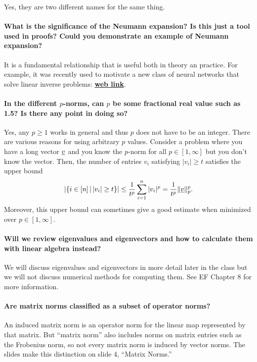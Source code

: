 \documentclass[10pt,english]{article}
\begin{document}
Yes, they are two different names for the same thing.

\paragraph{What is the significance of the Neumann expansion? Is this just a tool used in proofs? Could you demonstrate an example of Neumann expansion?}

It is a fundamental relationship that is useful both in theory an practice.
For example, it was recently used to motivate a new class of neural networks that solve linear inverse problems: \href{https://arxiv.org/pdf/1901.03707.pdf}{\textbf{web link}}.

\paragraph{In the different $p$-norms, can $p$ be some fractional real value such as 1.5? Is there any point in doing so?}

Yes, any $p\geq 1$ works in general and thus $p$ does not have to be an integer.
There are various reasons for using arbitrary $p$ values.
Consider a problem where you have a long vector $\underline{v}$ and you know the $p$-norm for all $p\in [1,\infty]$ but you don't know the vector.
Then, the number of entries $v_i$ satisfying $|v_i| \geq t$ satisfies the upper bound $$\left| \{i\in [n]\,|\, |v_i|\geq t \} \right| \leq \frac{1}{t^p} \sum_{i=1}^n |v_i|^p = \frac{1}{t^p} \| \underline{v} \|_p^p . $$
Moreover, this upper bound can sometimes give a good estimate when minimized over $p\in [1,\infty]$.

\paragraph{Will we review eigenvalues and eigenvectors and how to calculate them with linear algebra instead?}

We will discuss eigenvalues and eigenvectors in more detail later in the class but we will not discuss numerical methods for computing them.
See EF Chapter 8 for more information.

\paragraph{Are matrix norms classified as a subset of operator norms?}

An induced matrix norm is an operator norm for the linear map represented by that matrix.
But ``matrix norm'' also includes norms on matrix entries such as the Frobenius norm, so not every matrix norm is induced by vector norms.
The slides make this distinction on slide 4, ``Matrix Norms.''
\end{document}
